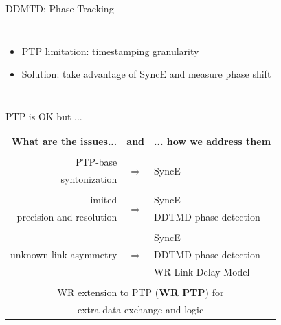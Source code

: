 \documentclass[compress,red]{beamer}
\begin{document}
\begin{frame}{DDMTD: Phase Tracking}

\begin{columns}[c]
    \begin{itemize}
      \item PTP limitation: timestamping granularity
      \item Solution: take advantage of SyncE and measure phase shift
    \end{itemize}
    \vspace{3.9cm}
\end{columns}
\end{frame}
\begin{frame}{PTP is OK but ...}

  \resizebox{11cm}{!} 
  {
    \begin{tabular}{ r c l }
  {\bf What are the issues...} 	& {\bf and}      & {\bf ... how we address them}  \\
				&     		 &        \\
      PTP-base		 	& \multirow{2}{*}{$\Rightarrow$}  & \multirow{2}{*}{SyncE }\\
      syntonization	        &      		 &        \\
				&      		 &        			\\
      limited             	&\multirow{2}{*}{$\Rightarrow$}  	 & SyncE \\
      precision and resolution  &      		 & DDTMD phase detection\\
				&    		 &        \\
			        &      		 & SyncE  \\
      unknown link asymmetry    & $\Rightarrow$  & DDTMD phase detection \\
				&      		 & WR Link Delay Model \\
				&      		 &        \\
      \multicolumn{3}{c}{WR extension to PTP ({\bf WR PTP}) for } \\
      \multicolumn{3}{c}{extra data exchange and logic} \\
    \end{tabular}
  }
\end{frame}
\end{document}
